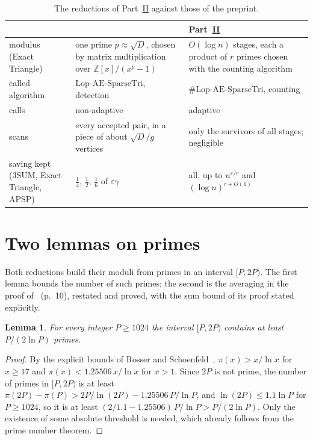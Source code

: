\documentclass[11pt]{article}
\newtheorem{lemma}[theorem]{Lemma}
\theoremstyle{definition}
\theoremstyle{remark}
\newcommand{\Z}{\mathbb{Z}}
\newcommand{\Lop}{\mathrm{Lop}\text{-}\allowbreak\mathrm{AE}\text{-}\allowbreak\mathrm{SparseTri}}
\begin{document}
\begin{table}[ht]
\centering\small
\renewcommand{\arraystretch}{1.15}\setlength{\tabcolsep}{4pt}
\begin{tabular}{@{}>{\raggedright}p{}>{\raggedright}p{}>{\raggedright\arraybackslash}p{}@{}}
 & \cite{ZT} & Part~\hyperref[m:partII]{II}\\\hline
modulus (Exact Triangle) & one prime $p\approx\sqrt D$, chosen by matrix multiplication over $\Z[x]/(x^p-1)$ & $O(\log n)$ stages, each a product of $r$ primes chosen with the counting algorithm\\
called algorithm & $\Lop$, detection & $\#\Lop$, counting\\
calls & non-adaptive & adaptive\\
scans & every accepted pair, in a piece of about $\sqrt D/g$ vertices & only the survivors of all stages; negligible\\
saving kept (3SUM, Exact Triangle, APSP) & $\frac14$, $\frac12$, $\frac16$ of $\varepsilon\gamma$ & all, up to $n^{\varepsilon/r}$ and $(\log n)^{r+O(1)}$
\end{tabular}
\caption{The reductions of Part~\hyperref[m:partII]{II} against those of the preprint.}
\label{tab:partII}
\end{table}

\section{Two lemmas on primes}\label{c:sec:primes}

Both reductions build their moduli from primes in an interval $[P,2P)$. The first lemma bounds the number of such primes; the second is the averaging in the proof of~\cite[Lemma~3.2]{FKP24} (p.~10), restated and proved, with the sum bound of its proof stated explicitly.

\begin{lemma}\label{c:lem:primes}
For every integer $P\ge1024$ the interval $[P,2P)$ contains at least $P/(2\ln P)$ primes.
\end{lemma}
\begin{proof}
By the explicit bounds of Rosser and Schoenfeld~\cite[Corollary~1]{RS62}, $\pi(x)>x/\ln x$ for $x\ge17$ and $\pi(x)<1.25506\,x/\ln x$ for $x>1$. Since $2P$ is not prime, the number of primes in $[P,2P)$ is at least $\pi(2P)-\pi(P)>2P/\ln(2P)-1.25506\,P/\ln P$, and $\ln(2P)\le1.1\ln P$ for $P\ge1024$, so it is at least $(2/1.1-1.25506)\,P/\ln P>P/(2\ln P)$. Only the existence of some absolute threshold is needed, which already follows from the prime number theorem.
\end{proof}
\end{document}
